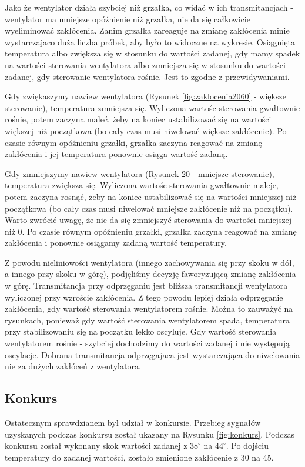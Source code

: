 \documentclass[12pt, a4paper]{article}
\begin{document}
Jako że wentylator działa szybciej niż grzałka, co widać w ich transmitancjach - wentylator ma mniejsze opóźnienie niż grzałka, nie da się całkowicie wyeliminować zakłócenia. Zanim grzałka zareaguje na zmianę zakłócenia minie wystarczajaco duża liczba próbek, aby było to widoczne na wykresie. Osiągnięta temperatura albo zwiększa się w stosunku do wartości zadanej, gdy mamy spadek na wartości sterowania wentylatora albo zmniejsza się w stosunku do wartości zadanej, gdy sterowanie wentylatora rośnie. Jest to zgodne z przewidywaniami. 

Gdy zwiękaszymy nawiew wentylatora (Rysunek \ref{fig:zaklocenia2060} - większe sterowanie), temperatura zmniejsza się. Wyliczona wartośc sterowania gwałtownie rośnie,  potem zaczyna maleć, żeby na koniec ustabilizować się na wartości większej niż początkowa (bo cały czas musi niwelować większe zakłócenie). Po czasie równym opóźnieniu grzałki, grzałka zaczyna reagować na zmianę zakłócenia i jej temperatura ponownie osiąga wartość zadaną.

Gdy zmniejszymy nawiew wentylatora (Rysunek 20 - mniejsze sterowanie), temperatura zwiększa się. Wyliczona wartośc sterowania gwałtownie maleje, potem zaczyna rosnąć, żeby na koniec ustabilizować się na wartości mniejszej niż początkowa (bo cały czas musi niwelować mniejsze zakłócenie niż na początku). Warto zwrócić uwagę, że nie da się zmniejszyć sterowania do wartości mniejszej niż 0. Po czasie równym opóźnieniu grzałki, grzałka zaczyna reagować na zmianę zakłócenia i ponownie osiągamy zadaną wartość temperatury.

Z powodu nieliniowości wentylatora (innego zachowywania się przy skoku w dół, a innego przy skoku w górę), podjęliśmy decyzję faworyzującą zmianę zakłócenia w górę. Transmitancja przy odprzęganiu jest bliższa transmitancji wentylatora wyliczonej przy wzroście zakłócenia. Z tego powodu lepiej działa odprzęganie zakłócenia, gdy wartość sterowania wentylatorem rośnie. Można to zauważyć na rysunkach, ponieważ gdy wartość sterowania wentylatorem spada, temperatura przy stabilizowaniu się na początku lekko oscyluje. Gdy wartość sterowania wentylatorem rośnie - szybciej dochodzimy do wartości zadanej i nie występują oscylacje. Dobrana transmitancja odprzęgajaca jest wystarczająca do niwelowania nie za dużych zakłóceń z wentylatora.


\subsection{Konkurs}
Ostatecznym sprawdzianem był udział w konkursie. Przebieg sygnałów uzyskanych podczas konkursu został ukazany na Rysunku \ref{fig:konkurs}. Podczas konkursu został wykonany skok wartości zadanej z $38^\circ$ na $44^\circ$. Po dojściu temperatury do zadanej wartości, zostało zmienione zakłócenie z 30 na 45. 
\end{document}
